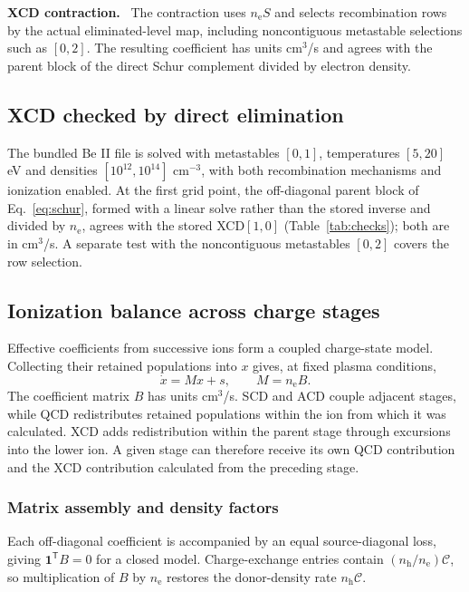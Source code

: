 \documentclass[11pt,a4paper]{article}
\newcommand{\vb}[1]{\boldsymbol{#1}}
\newcommand{\nelec}{n_{\mathrm e}}
\newcommand{\nh}{n_{\mathrm h}}
\newenvironment{implnote}[1][Implementation]{%
  \par\smallskip\noindent\begin{lrbox}{\notebox}\setlength{\fboxsep}{6pt}\begin{minipage}{\dimexpr\linewidth-2\fboxsep-2\fboxrule\relax}\small\textbf{#1.}\ }{%
  \end{minipage}\end{lrbox}\setlength{\fboxsep}{6pt}\fcolorbox{noteframe}{notebg}{\usebox{\notebox}}\par\smallskip}
\numberwithin{equation}{section}
\begin{document}
\begin{implnote}[XCD contraction]
The contraction uses $\nelec S$ and selects recombination rows by the actual
eliminated-level map, including noncontiguous metastable selections such as
$[0,2]$. The resulting coefficient has units cm$^3$/s and agrees with the
parent block of the direct Schur complement divided by electron density.
\end{implnote}

\subsection{XCD checked by direct elimination}

The bundled Be II file is solved with metastables $[0,1]$, temperatures
$[5,20]$ eV and densities $[10^{12},10^{14}]$ cm$^{-3}$, with both
recombination mechanisms and ionization enabled. At the first grid point,
the off-diagonal parent block of Eq.~\eqref{eq:schur}, formed with a linear
solve rather than the stored inverse and divided by $\nelec$, agrees with the
stored XCD$[1,0]$ (Table~\ref{tab:checks}); both are in cm$^3$/s. A separate
test with the noncontiguous metastables $[0,2]$ covers the row selection.

\subsection{Ionization balance across charge stages}\label{sec:ionbalance}

Effective coefficients from successive ions form a coupled
charge-state model. Collecting their retained populations into $x$
gives, at fixed plasma conditions,
\begin{equation}
 \dot x=Mx+s,\qquad M=\nelec B.
\end{equation}
The coefficient matrix $B$ has units cm$^3$/s. SCD and ACD couple
adjacent stages, while QCD redistributes retained populations within
the ion from which it was calculated. XCD adds redistribution within
the parent stage through excursions into the lower ion. A given stage
can therefore receive its own QCD contribution and the XCD contribution
calculated from the preceding stage.

\subsubsection{Matrix assembly and density factors}

Each off-diagonal coefficient is accompanied by an equal source-diagonal
loss, giving $\vb1^{\mathsf T}B=0$ for a closed model. Charge-exchange
entries contain $(\nh/\nelec)\mathcal C$, so multiplication of $B$ by
$\nelec$ restores the donor-density rate $\nh\mathcal C$.
\end{document}
